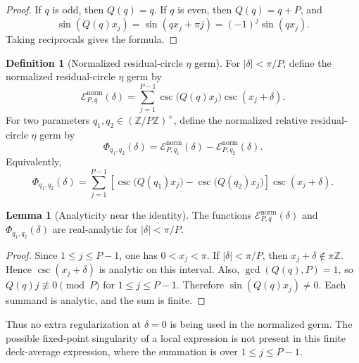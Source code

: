 \documentclass{article}
\theoremstyle{definition}
\newtheorem{lemma}[theorem]{Lemma}
\newtheorem{definition}[theorem]{Definition}
\numberwithin{equation}{section}
\begin{document}
\begin{proof}
If $q$ is odd, then $Q(q)=q$.  If $q$ is even, then $Q(q)=q+P$, and
\begin{equation}
\sin(Q(q)x_j)=\sin(qx_j+\pi j)=(-1)^j\sin(qx_j).
\end{equation}
Taking reciprocals gives the formula.
\end{proof}

\begin{definition}[Normalized residual-circle $\eta$ germ]
For $|\delta|<\pi/P$, define the normalized residual-circle $\eta$ germ by
\begin{equation}
\mathcal E^{\text{norm}}_{P,q}(\delta)
=
\sum_{j=1}^{P-1}
\csc\bigl(Q(q)x_j\bigr)\csc(x_j+\delta).
\end{equation}
For two parameters $q_1,q_2\in(\mathbb Z/P\mathbb Z)^\times$, define the normalized relative residual-circle $\eta$ germ by
\begin{equation}
\Phi_{q_1,q_2}(\delta)
=
\mathcal E^{\text{norm}}_{P,q_1}(\delta)
-
\mathcal E^{\text{norm}}_{P,q_2}(\delta).
\end{equation}
Equivalently,
\begin{equation}
\Phi_{q_1,q_2}(\delta)
=
\sum_{j=1}^{P-1}
\left[
\csc\bigl(Q(q_1)x_j\bigr)
-
\csc\bigl(Q(q_2)x_j\bigr)
\right]\csc(x_j+\delta).
\end{equation}
\end{definition}

\begin{lemma}[Analyticity near the identity]
\label{lem:normalized-residual-germ-analytic}
The functions $\mathcal E^{\text{norm}}_{P,q}(\delta)$ and $\Phi_{q_1,q_2}(\delta)$ are real-analytic for $|\delta|<\pi/P$.
\end{lemma}

\begin{proof}
Since $1\leq j\leq P-1$, one has $0<x_j<\pi$.  If $|\delta|<\pi/P$, then $x_j+\delta\notin\pi\mathbb Z$.  Hence $\csc(x_j+\delta)$ is analytic on this interval.  Also, $\gcd(Q(q),P)=1$, so $Q(q)j\not\equiv0\pmod P$ for $1\leq j\leq P-1$.  Therefore $\sin(Q(q)x_j)\neq 0$.  Each summand is analytic, and the sum is finite.
\end{proof}

Thus no extra regularization at $\delta=0$ is being used in the normalized germ.  The possible fixed-point singularity of a local expression is not present in this finite deck-average expression, where the summation is over $1\leq j\leq P-1$.
\end{document}

